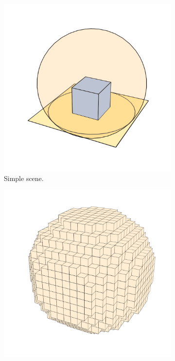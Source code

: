 \begin{figure}[t]
  \centering
  \begin{subfigure}[b]{0.249\textwidth}
    \centering
  \includegraphics[width=\textwidth]{./img/raw/besluit-geom/scene.png}
  \caption{Simple scene.}
  \label{fig:vo-geometrie:0}
  \end{subfigure}%
  \begin{subfigure}[b]{0.249\textwidth}
    \centering
  \includegraphics[width=\textwidth]{./img/raw/besluit-geom/light.png}

\end{subfigure}
\end{figure}

